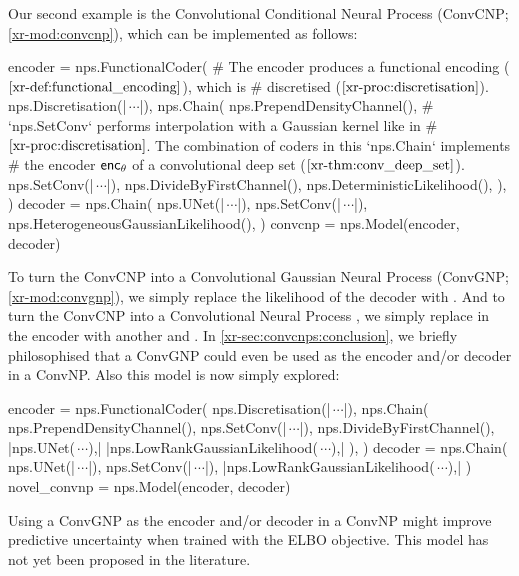 \documentclass[12pt, twoside]{report}
\newcommand{\xrprefix}[1]{xr-#1}
\begin{document}
Our second example is the Convolutional Conditional Neural Process (ConvCNP; \cref{\xrprefix{mod:convcnp}}), which can be implemented as follows:
\begin{pythoncode}{\small}{}
encoder = nps.FunctionalCoder(  
    # The encoder produces a functional encoding ($\text{\cref{\xrprefix{def:functional_encoding}}}$), which is
    # discretised ($\text{\cref{\xrprefix{proc:discretisation}}}$).
    nps.Discretisation(|$\,\cdots$|),
    nps.Chain(
        nps.PrependDensityChannel(),
        # `nps.SetConv` performs interpolation with a Gaussian kernel like in
        # $\text{\cref{\xrprefix{proc:discretisation}}}$. The combination of coders in this `nps.Chain` implements
        # the encoder $\mathsf{enc}_\theta$ of a convolutional deep set ($\text{\cref{\xrprefix{thm:conv_deep_set}}}$).
        nps.SetConv(|$\,\cdots$|),  
        nps.DivideByFirstChannel(),
        nps.DeterministicLikelihood(),
    ),
)
decoder = nps.Chain(
    nps.UNet(|$\,\cdots$|),
    nps.SetConv(|$\,\cdots$|),
    nps.HeterogeneousGaussianLikelihood(),
)
convcnp = nps.Model(encoder, decoder)
\end{pythoncode}
To turn the ConvCNP into a Convolutional Gaussian Neural Process (ConvGNP; \cref{\xrprefix{mod:convgnp}}),
we simply replace the likelihood of the decoder with .
And to turn the ConvCNP into a Convolutional Neural Process \parencite[ConvNP;][]{Foong:2020:Meta-Learning_Stationary_Stochastic_Process_Prediction},
we simply replace  in the encoder with another  and .
In \cref{\xrprefix{sec:convcnps:conclusion}},
we briefly philosophised that a ConvGNP could even be used as the encoder and/or decoder in a ConvNP.
Also this model is now simply explored:
\begin{pythoncode}{\small}{}
encoder = nps.FunctionalCoder(  
    nps.Discretisation(|$\,\cdots$|),
    nps.Chain(
        nps.PrependDensityChannel(),
        nps.SetConv(|$\,\cdots$|),  
        nps.DivideByFirstChannel(),
        |\textcolor{redaccent}{nps.UNet($\,\cdots$),}|
        |\textcolor{redaccent}{nps.LowRankGaussianLikelihood($\,\cdots$),}|
    ),
)
decoder = nps.Chain(
    nps.UNet(|$\,\cdots$|),
    nps.SetConv(|$\,\cdots$|),
    |\textcolor{redaccent}{nps.LowRankGaussianLikelihood($\,\cdots$),}|
)
novel_convnp = nps.Model(encoder, decoder)
\end{pythoncode}
Using a ConvGNP as the encoder and/or decoder in a ConvNP
might improve predictive uncertainty when trained with the ELBO objective.
This model has not yet been proposed in the literature. 
\end{document}
